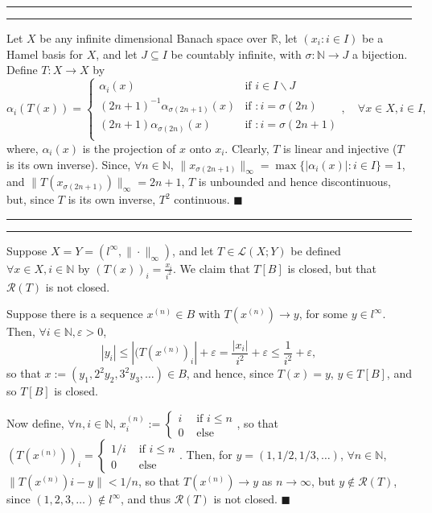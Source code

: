 \documentclass[11pt]{article}
\newcounter{questionCounter}
\newcounter{partCounter}[questionCounter]
\newenvironment{question}[2][\arabic{questionCounter}]{%
    \setcounter{partCounter}{0}%
    \vspace{.25in} \hrule \vspace{0.5em}%
        \noindent{\bf #2}%
    \vspace{0.8em} \hrule \vspace{.10in}%
    \addtocounter{questionCounter}{1}%
}{}
\renewcommand{\qed}{\quad $\blacksquare$}
\newcommand{\inv}{^{-1}}
\newcommand{\sminus}{\backslash}
\newcommand{\N}{\mathbb{N}} %
\newcommand{\R}{\mathbb{R}} %
\newcommand{\Ran}{\mathcal{R}} %
\renewcommand{\L}{\mathcal{L}} %
\newcommand{\e}{\varepsilon} %
\begin{document}
\newpage
\begin{question}{Problem 12}
Let $X$ be any infinite dimensional Banach space over $\R$, let
$(x_i : i \in I)$ be a Hamel basis for $X$, and let $J \subseteq I$ be
countably infinite, with $\sigma : \N \rightarrow J$ a bijection. Define
$T : X \rightarrow X$ by
\[\alpha_i(T(x)) = 
  \left\{
    \begin{array}{cl}
      \alpha_i(x) & \mbox{if } i \in I \sminus J \\
      (2n + 1)\inv\alpha_{\sigma(2n + 1)}(x) & \mbox{if } : i = \sigma(2n) \\
      (2n + 1)\alpha_{\sigma(2n)}(x) & \mbox{if } : i = \sigma(2n + 1) \\
    \end{array}
  \right., \quad \forall x \in X, i \in I,
\]
where, $\alpha_i(x)$ is the projection of $x$ onto $x_i$. Clearly, $T$ is
linear and injective ($T$ is its own inverse). Since, $\forall n \in \N$,
$\|x_{\sigma(2n + 1)}\|_{\infty} = \max\{|\alpha_i(x)| : i \in I\} = 1$, and
$\|T(x_{\sigma(2n + 1)})\|_{\infty} = 2n + 1$, $T$ is unbounded and hence
discontinuous, but, since $T$ is its own inverse, $T^2$ continuous. \qed
\end{question}

\begin{question}{Problem 15}
Suppose $X = Y = (l^{\infty}, \|\cdot\|_{\infty})$, and let $T \in \L(X;Y)$ be
defined $\forall x \in X, i \in \N$ by $(T(x))_i = \frac{x_i}{i^2}$. We claim
that $T[B]$ is closed, but that $\Ran(T)$ is not closed.

Suppose there is a sequence $x^{(n)} \in B$ with $T(x^{(n)}) \rightarrow y$,
for some $y \in l^{\infty}$. Then, $\forall i \in \N, \e > 0$,
\[|y_i|
   \leq |(T(x^{(n)})_i| + \e
   =    \frac{|x_i|}{i^2} + \e
   \leq \frac{1}{i^2} + \e,
\]
so that $x := (y_1,2^2y_2,3^2y_3,\dots) \in B$, and hence, since $T(x) = y$,
$y \in T[B]$, and so $T[B]$ is closed.

Now define, $\forall n,i \in \N$,
$x^{(n)}_i :=
            \left\{
                \begin{array}{cl}
                    i & \mbox{ if } i \leq n \\
                    0 & \mbox{ else }
                \end{array}
            \right.$,
so that
$(T(x^{(n)}))_i =
            \left\{
                \begin{array}{cl}
                    1/i & \mbox{ if } i \leq n \\
                    0 & \mbox{ else }
                \end{array}
            \right.$.
Then, for $y = (1,1/2,1/3,\dots)$, $\forall n \in \N$,
$\|T(x^{(n)})i - y\| < 1/n$, so that $T(x^{(n)}) \rightarrow y$ as
$n \rightarrow \infty$, but $y \notin \Ran(T)$, since
$(1,2,3,\dots) \notin l^{\infty}$, and thus $\Ran(T)$ is not closed. \qed
\end{question}
\end{document}
